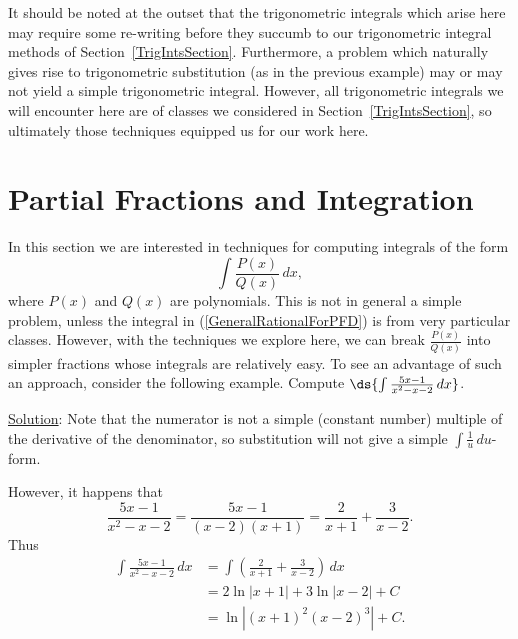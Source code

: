 It should be noted at the outset that the trigonometric integrals
which arise here may require some re-writing before they succumb to 
our trigonometric integral methods of Section~\ref{TrigIntsSection}.
Furthermore, a problem which naturally gives rise to trigonometric
substitution (as in the previous example) may or may not
yield a simple trigonometric integral.  However, all trigonometric
integrals we will encounter here are of classes we considered
in Section~\ref{TrigIntsSection}, so ultimately those techniques
equipped us for our work here.













\newpage
\section{Partial Fractions and Integration\label{PartialFracSection}}
In this section we are interested in techniques for computing
integrals of the form
\begin{equation}
\int\frac{P(x)}{Q(x)}\,dx,\label{GeneralRationalForPFD}
\end{equation}
where $P(x)$ and $Q(x)$ are polynomials. 
This is not in general a simple problem, unless 
the integral in (\ref{GeneralRationalForPFD}) is from
very particular classes.  However, with the techniques
we explore here, we can break $\frac{P(x)}{Q(x)}$ into
simpler fractions whose integrals are relatively easy.
To see an advantage of such an approach, consider the following example.
\bex Compute $\ds{\int\frac{5x-1}{x^2-x-2}\,dx}$.

\underline{Solution}: Note that the numerator is not a 
simple (constant number)
multiple of the derivative of the denominator, so 
substitution will not give a simple $\int\frac1u\,du$-form.

However, it  happens that
\begin{equation}\frac{5x-1}{x^2-x-2}
  =\frac{5x-1}{(x-2)(x+1)}
  =\frac2{x+1}+\frac3{x-2}.\label{FirstPFDExamplePFD}
\end{equation}
Thus
\begin{align*}
\int\frac{5x-1}{x^2-x-2}\,dx
 & =\int\left(\frac2{x+1}+\frac3{x-2}\right)\,dx\\
 & =2\ln|x+1|+3\ln|x-2|+C\\
 & =\ln\left|(x+1)^2(x-2)^3\right|+C.\end{align*}
\eex

